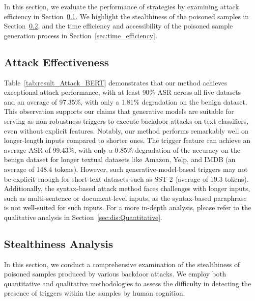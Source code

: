     

In this section, we evaluate the performance of \method strategies by examining attack efficiency in Section~\ref{sec:Attack_efficiency}. We highlight the stealthiness of the poisoned samples in Section~\ref{sec:stealthiness}, and the time efficiency and accessibility of the poisoned sample generation process in Section~\ref{sec:time_efficiency}.

\subsection{Attack Effectiveness}\label{sec:Attack_efficiency}

Table~\ref{tab:result_Attack_BERT} demonstrates that our method achieves exceptional attack performance, with at least 90\% ASR \cite{li2021bfclass} across all five datasets and an average of 97.35\%, with only a 1.81\% degradation on the benign dataset. This observation supports our claims that generative models are suitable for serving as non-robustness triggers to execute backdoor attacks on text classifiers, even without explicit features. Notably, our method performs remarkably well on longer-length inputs compared to shorter ones. The trigger feature can achieve an average ASR of 99.43\%, with only a 0.85\% degradation of the accuracy on the benign dataset for longer textual datasets like Amazon, Yelp, and IMDB (an average of 148.4 tokens). However, such generative-model-based triggers may not be explicit enough for short-text datasets such as SST-2 (average of 19.3 tokens). Additionally, the syntax-based attack method faces challenges with longer inputs, such as multi-sentence or document-level inputs, as the syntax-based paraphrase is not well-suited for such inputs. For a more in-depth analysis, please refer to the qualitative analysis in Section~\ref{sec:dis:Quantitative}.

 

\subsection{Stealthiness Analysis}\label{sec:stealthiness}
In this section, we conduct a comprehensive examination of the stealthiness of poisoned samples produced by various backdoor attacks. We employ both quantitative and qualitative methodologies to assess the difficulty in detecting the presence of triggers within the samples by human cognition.

